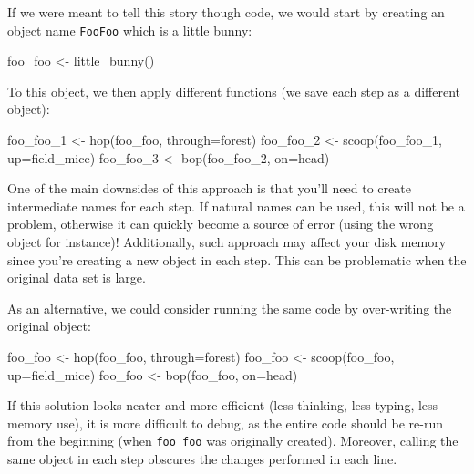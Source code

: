 \documentclass[
]{krantz}
\makeatletter
\newenvironment{Shaded}{\begin{snugshade}}{\end{snugshade}}
\newcommand{\AttributeTok}[1]{\textcolor[rgb]{0.61,0.61,0.61}{#1}}
\newcommand{\FunctionTok}[1]{\textcolor[rgb]{0,0,0}{#1}}
\newcommand{\NormalTok}[1]{#1}
\newcommand{\OtherTok}[1]{\textcolor[rgb]{0.37,0.37,0.37}{#1}}
\newenvironment{kframe}{%
\medskip{}
\setlength{\fboxsep}{.8em}
 \def\at@end@of@kframe{}%
 \ifinner\ifhmode%
  \def\at@end@of@kframe{\end{minipage}}%
  \begin{minipage}{\columnwidth}%
 \fi\fi%
 \def\FrameCommand##1{\hskip\@totalleftmargin \hskip-\fboxsep
 \colorbox{shadecolor}{##1}\hskip-\fboxsep
     \hskip-\linewidth \hskip-\@totalleftmargin \hskip\columnwidth}%
 \MakeFramed {\advance\hsize-\width
   \@totalleftmargin\z@ \linewidth\hsize
   \@setminipage}}%
 {\par\unskip\endMakeFramed%
 \at@end@of@kframe}
\renewenvironment{Shaded}{\begin{kframe}}{\end{kframe}}
\makeatother
\begin{document}
If we were meant to tell this story though code, we would start by creating an object name \texttt{FooFoo} which is a little bunny:

\begin{Shaded}
\begin{Highlighting}[]
\NormalTok{foo\_foo }\OtherTok{\textless{}{-}} \FunctionTok{little\_bunny}\NormalTok{()}
\end{Highlighting}
\end{Shaded}

To this object, we then apply different functions (we save each step as a different object):

\begin{Shaded}
\begin{Highlighting}[]
\NormalTok{foo\_foo\_1 }\OtherTok{\textless{}{-}} \FunctionTok{hop}\NormalTok{(foo\_foo, }\AttributeTok{through=}\NormalTok{forest)}
\NormalTok{foo\_foo\_2 }\OtherTok{\textless{}{-}} \FunctionTok{scoop}\NormalTok{(foo\_foo\_1, }\AttributeTok{up=}\NormalTok{field\_mice)}
\NormalTok{foo\_foo\_3 }\OtherTok{\textless{}{-}} \FunctionTok{bop}\NormalTok{(foo\_foo\_2, }\AttributeTok{on=}\NormalTok{head)}
\end{Highlighting}
\end{Shaded}

One of the main downsides of this approach is that you'll need to create intermediate names for each step. If natural names can be used, this will not be a problem, otherwise it can quickly become a source of error (using the wrong object for instance)! Additionally, such approach may affect your disk memory since you're creating a new object in each step. This can be problematic when the original data set is large.

As an alternative, we could consider running the same code by over-writing the original object:

\begin{Shaded}
\begin{Highlighting}[]
\NormalTok{foo\_foo }\OtherTok{\textless{}{-}} \FunctionTok{hop}\NormalTok{(foo\_foo, }\AttributeTok{through=}\NormalTok{forest)}
\NormalTok{foo\_foo }\OtherTok{\textless{}{-}} \FunctionTok{scoop}\NormalTok{(foo\_foo, }\AttributeTok{up=}\NormalTok{field\_mice)}
\NormalTok{foo\_foo }\OtherTok{\textless{}{-}} \FunctionTok{bop}\NormalTok{(foo\_foo, }\AttributeTok{on=}\NormalTok{head)}
\end{Highlighting}
\end{Shaded}

If this solution looks neater and more efficient (less thinking, less typing, less memory use), it is more difficult to debug, as the entire code should be re-run from the beginning (when \texttt{foo\_foo} was originally created). Moreover, calling the same object in each step obscures the changes performed in each line.
\end{document}
